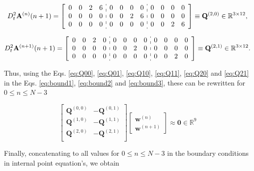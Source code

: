 \begin{equation}\label{eq:Q20}
D_{t}^{2} \mathbf{A}^{(n)}(n+1)
=
\left[
\begin{array}{cccc:cccc:cccc}
0 & 0 & 2 & 6 &
0 & 0 & 0 & 0 &
0 & 0 & 0 & 0 \\
0 & 0 & 0 & 0 &
0 & 0 & 2 & 6 &
0 & 0 & 0 & 0 \\
0 & 0 & 0 & 0 &
0 & 0 & 0 & 0 &
0 & 0 & 2 & 6 
\end{array}
\right]
\equiv \mathbf{Q}^{(2,0)}\in \mathbb{R}^{3\times 12},
\end{equation}

\begin{equation}\label{eq:Q21}
D_{t}^{2} \mathbf{A}^{(n+1)}(n+1)
=
\left[
\begin{array}{cccc:cccc:cccc}
0 & 0 & 2 & 0 &
0 & 0 & 0 & 0 &
0 & 0 & 0 & 0 \\
0 & 0 & 0 & 0 &
0 & 0 & 2 & 0 &
0 & 0 & 0 & 0 \\
0 & 0 & 0 & 0 &
0 & 0 & 0 & 0 &
0 & 0 & 2 & 0 
\end{array}
\right]
\equiv \mathbf{Q}^{(2,1)}\in \mathbb{R}^{3\times 12}.
\end{equation}

Thus,
using the Eqs. \ref{eq:Q00}, \ref{eq:Q01}, \ref{eq:Q10}, \ref{eq:Q11}, \ref{eq:Q20} and \ref{eq:Q21} in 
the Eqs. \ref{eq:bound1}, \ref{eq:bound2} and \ref{eq:bound3}, 
these can be rewritten for $0 \leq n\leq N-3$

\begin{equation}
\begin{bmatrix}
\mathbf{Q}^{(0,0)} & -\mathbf{Q}^{(0,1)}\\
\mathbf{Q}^{(1,0)} & -\mathbf{Q}^{(1,1)}\\
\mathbf{Q}^{(2,0)} & -\mathbf{Q}^{(2,1)}\\
\end{bmatrix}
\begin{bmatrix}
\mathbf{w}^{(n)}\\
\mathbf{w}^{(n+1)}
\end{bmatrix}
\approx\mathbf{0}\in \mathbb{R}^{9}
\end{equation}

Finally, 
concatenating to all values for $0 \leq n\leq N-3$
in the boundary conditions in internal point equation's, we obtain

